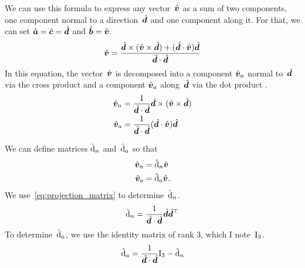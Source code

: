 We can use this formula to express any vector~$\hat{\bm{v}}$ as a sum of two components,
one component normal to a direction~$\hat{\bm{d}}$
and
one component along it.
For that, we can set $\hat{\bm{a}} = \hat{\bm{c}} = \hat{\bm{d}}$ and $\hat{\bm{b}}=\hat{\bm{v}}$.
\begin{equation}
    \hat{\bm{v}} =
    \frac{
        \hat{\bm{d}} \times (\hat{\bm{v}} \times \hat{\bm{d}}) +
        (\hat{\bm{d}} \cdot \hat{\bm{v}}) \hat{\bm{d}}
    }{
        \hat{\bm{d}} \cdot \hat{\bm{d}}
    }
    \label{eq:vector_triple_product_decomposition}
\end{equation}
In this equation, the vector~$\hat{\bm{v}}$ is decomposed into a component
$\hat{\bm{v}}_n$ normal to~$\hat{\bm{d}}$ via the cross product
and a component
$\hat{\bm{v}}_a$ along~$\hat{\bm{d}}$ via the dot product%
.
\begin{subequations}
    \begin{align}
        \hat{\bm{v}}_n
        &=
        \frac{1}{\hat{\bm{d}} \cdot \hat{\bm{d}}}
        \hat{\bm{d}} \times (\hat{\bm{v}} \times \hat{\bm{d}})
        \\
        \hat{\bm{v}}_a
        &=
        \frac{1}{\hat{\bm{d}} \cdot \hat{\bm{d}}}
        (\hat{\bm{d}} \cdot \hat{\bm{v}}) \hat{\bm{d}}
    \end{align}
\end{subequations}

We can define matrices $\hat{\mathrm{d}}_n$ and~$\hat{\mathrm{d}}_a$ so that
\begin{subequations}
    \begin{align}
        \hat{\bm{v}}_n &= \hat{\mathrm{d}}_n \hat{\bm{v}} \\
        \hat{\bm{v}}_a &= \hat{\mathrm{d}}_a \hat{\bm{v}}
        \text{.}
    \end{align}
\end{subequations}
We use~\cref{eq:projection_matrix} to determine~$\hat{\mathrm{d}}_n$.
\begin{equation}
    \hat{\mathrm{d}}_n = \frac{1}{\hat{\bm{d}} \cdot \hat{\bm{d}}} \hat{\bm{d}} \hat{\bm{d}}^\top
    \label{eq:matrix_decomposition_normal}
\end{equation}
To determine~$\hat{\mathrm{d}}_a$, we use the identity matrix of rank 3, which I note~$\mathrm{I}_3$.
\begin{equation}
    \hat{\mathrm{d}}_a = \frac{1}{\hat{\bm{d}} \cdot \hat{\bm{d}}} \mathrm{I}_3 - \hat{\mathrm{d}}_n
    \label{eq:matrix_decomposition_along}
\end{equation}


